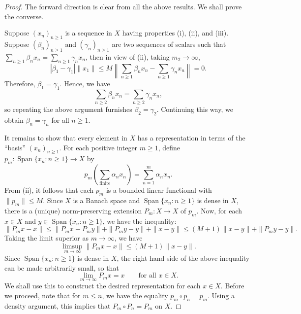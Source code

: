 \documentclass[11pt]{article}
\theoremstyle{thmstyle}
\theoremstyle{defstyle}
\newcommand{\Span}{\operatorname{Span}}
\renewcommand{\le}{\leqslant}
\renewcommand{\ge}{\geqslant}
\begin{document}
\begin{proof}
	The forward direction is clear from all the above results. We shall prove the converse.

	Suppose $(x_n)_{n\ge 1}$ is a sequence in $X$ having properties (i), (ii), and (iii). Suppose $(\beta_n)_{n\ge 1}$ and $(\gamma_n)_{n\ge 1}$ are two sequences of scalars such that $\displaystyle\sum_{n\ge 1}\beta_n x_n = \sum_{n\ge 1}\gamma_n x_n$, then in view of (ii), taking $m_2\to\infty$,
	\begin{equation*}
		|\beta_1 - \gamma_1|\|x_1\|\le M\left\|\sum_{n\ge 1}\beta_n x_n - \sum_{n\ge 1} \gamma_n x_n\right\| = 0.
	\end{equation*}
	Therefore, $\beta_1 = \gamma_1$. Hence, we have 
	\begin{equation*}
		\sum_{n\ge 2}\beta_n x_n = \sum_{n\ge 2} \gamma_n x_n,
	\end{equation*}
	so repeating the above argument furnishes $\beta_2 = \gamma_2$. Continuing this way, we obtain $\beta_n = \gamma_n$ for all $n\ge 1$.

	It remains to show that every element in $X$ has a representation in terms of the ``basis'' $(x_n)_{n\ge 1}$. For each positive integer $m\ge 1$, define $p_m\colon\Span\{x_n\colon n\ge 1\}\to X$ by 
	\begin{equation*}
		p_m\left(\sum_{\text{finite}}\alpha_n x_n\right) = \sum_{n = 1}^{m}\alpha_n x_n.
	\end{equation*}
	From (ii), it follows that each $p_m$ is a bounded linear functional with $\|p_m\|\le M$. Since $X$ is a Banach space and $\Span\{x_n\colon n\ge 1\}$ is dense in $X$, there is a (unique) norm-preserving extension $P_m\colon X\to X$ of $p_m$. Now, for each $x\in X$ and $y\in\Span\{x_n\colon n\ge 1\}$, we have the inequality: 
	\begin{equation*}
		\|P_m x - x\|\le \|P_m x - P_m y\| + \|P_m y - y\| + \|x - y\|\le (M + 1)\|x - y\| + \|P_m y - y\|.
	\end{equation*}
	Taking the limit superior as $m\to\infty$, we have 
	\begin{equation*}
		\limsup_{m\to\infty} \|P_m x - x\|\le (M + 1)\|x - y\|.
	\end{equation*}
	Since $\Span\{x_n\colon n\ge 1\}$ is dense in $X$, the right hand side of the above inequality can be made arbitrarily small, so that 
	\begin{equation*}
		\lim_{m\to\infty} P_m x = x\qquad\text{for all }x\in X.
	\end{equation*}
	We shall use this to construct the desired representation for each $x\in X$. Before we proceed, note that for $m\le n$, we have the equality $p_m\circ p_n = p_m$. Using a density argument, this implies that $P_m\circ P_n = P_m$ on $X$. 
	

\end{proof}
\end{document}
